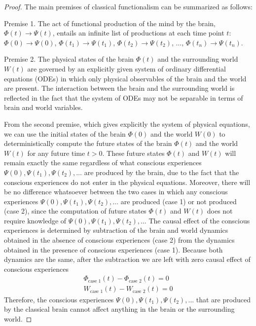 \documentclass{ws-ijmpb}
\begin{document}
\begin{proof}
The main premises of classical functionalism can be summarized as
follows:

Premise 1. The act of functional production of the mind by the brain,
$\Phi(t)\rightarrow\Psi(t)$, entails an infinite list of productions
at each time point $t$: $\Phi(0)\rightarrow\Psi(0)$, $\Phi(t_1)\rightarrow\Psi(t_1)$,
$\Phi(t_2)\rightarrow\Psi(t_2)$, $\ldots$, $\Phi(t_n)\rightarrow\Psi(t_n)$.

Premise 2. The physical states of the brain $\Phi(t)$ and the surrounding
world $W(t)$ are governed by an explicitly given system of ordinary
differential equations (ODEs) in which only physical observables of
the brain and the world are present. The interaction between the brain and the surrounding world is reflected in the fact that the system of ODEs may not be separable in terms of brain and world variables.

From the second premise, which gives explicitly the system of physical
equations, we can use the initial states of the brain $\Phi(0)$ and
the world $W(0)$ to deterministically compute the future states of
the brain $\Phi(t)$ and the world $W(t)$ for any future time $t>0$.
These future states $\Phi(t)$ and $W(t)$ will remain exactly the
same regardless of what conscious experiences $\Psi(0),\Psi(t_1),\Psi(t_2),\ldots$
are produced by the brain, due to the fact that the conscious experiences
do not enter in the physical equations. Moreover, there will be no
difference whatsoever between the two cases in which any conscious
experiences $\Psi(0),\Psi(t_1),\Psi(t_2),\ldots$ are produced (case 1)
or not produced (case 2), since the computation of future states $\Phi(t)$
and $W(t)$ does not require knowledge of $\Psi(0),\Psi(t_1),\Psi(t_2),\ldots$
The causal effect of the conscious experiences is determined by subtraction
of the brain and world dynamics obtained in the absence of conscious
experiences (case 2) from the dynamics obtained in the presence of
conscious experiences (case 1). Because both dynamics are the same,
after the subtraction we are left with zero causal effect of conscious experiences
\begin{gather}
\Phi_\textrm{case~1}(t)-\Phi_\textrm{case~2}(t) = 0 \\
W_\textrm{case~1}(t)-W_\textrm{case~2}(t) = 0
\end{gather}
Therefore, the conscious experiences $\Psi(0),\Psi(t_1),\Psi(t_2),\ldots$ that are
produced by the classical brain cannot affect anything in the brain
or the surrounding world.


\end{proof}
\end{document}
